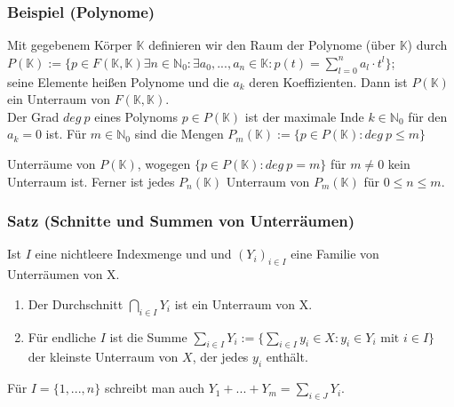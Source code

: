 \subsubsection{Beispiel (Polynome)}
Mit gegebenem Körper $\mathbb{K}$ definieren wir den Raum der Polynome (über $\mathbb{K}$) durch \\$P(\mathbb{K}) := \{p\in F(\mathbb{K},\mathbb{K}) \exists n\in\mathbb{N}_0: \exists a_0, ..., a_n \in \mathbb{K} : p(t)=\sum^{n}_{l=0} a_l \cdot t^l\}$;\\
seine Elemente heißen Polynome und die $a_k$ deren Koeffizienten. Dann ist $P(\mathbb{K})$ ein Unterraum von $F(\mathbb{K},\mathbb{K})$.\\
Der Grad $deg\ p$ eines Polynoms $p\in P(\mathbb{K})$ ist der maximale Inde $k\in\mathbb{N}_0$ für den $a_k=0$ ist. Für $m\in\mathbb{N}_0$ sind die Mengen $P_m(\mathbb{K}) := \{p\in P(\mathbb{K}):deg\ p \le m\}$

Unterräume von $P(\mathbb{K})$, wogegen $\{p\in P(\mathbb{K}): deg\ p =m\}$ für $m\neq 0$ kein Unterraum ist. Ferner ist jedes $P_n(\mathbb{K})$ Unterraum von $P_m(\mathbb{K})$ für $0\le n\le m$.
\subsubsection{Satz (Schnitte und Summen von Unterräumen)}
Ist $I$ eine nichtleere Indexmenge und und $(Y_i)_{i\in I}$ eine Familie von Unterräumen von X.
\begin{enumerate}
\item Der Durchschnitt $\displaystyle\bigcap_{i\in I} Y_i$ ist ein Unterraum von X.
\item Für endliche $I$ ist die Summe $\displaystyle\sum_{i\in I}Y_i := \{\sum_{i\in I} y_i\in X: y_i\in Y_i \text{ mit } i\in I\}$ der kleinste Unterraum von $X$, der jedes $y_i$ enthält.
\end{enumerate}
Für $I=\{1,...,n\}$ schreibt man auch $\displaystyle Y_1+...+Y_m=\sum_{i\in J} Y_i$.

